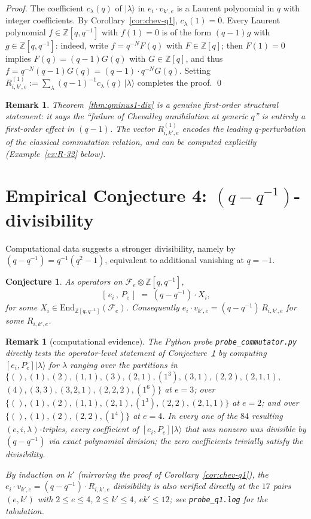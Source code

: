 \documentclass[11pt]{article}
\newtheorem{remark}[theorem]{Remark}
\newtheorem{conjecture}[theorem]{Conjecture}
\theoremstyle{definition}
\newcommand{\Fock}{\mathcal{F}}
\newcommand{\vke}{v_{k',e}}
\begin{document}
\begin{proof}
The coefficient $c_\lambda(q)$ of $|\lambda\rangle$ in $e_i \cdot \vke$ is a
Laurent polynomial in $q$ with integer coefficients. By
Corollary~\ref{cor:chev-q1}, $c_\lambda(1) = 0$. Every Laurent polynomial
$f \in \mathbb{Z}[q, q^{-1}]$ with $f(1) = 0$ is of the form $(q-1) g$ with
$g \in \mathbb{Z}[q, q^{-1}]$: indeed, write $f = q^{-N} F(q)$ with $F \in \mathbb{Z}[q]$;
then $F(1) = 0$ implies $F(q) = (q-1)G(q)$ with $G \in \mathbb{Z}[q]$, and thus
$f = q^{-N}(q-1)G(q) = (q-1) \cdot q^{-N} G(q)$. Setting
$R_{i,k',e}^{(1)} := \sum_\lambda (q-1)^{-1} c_\lambda(q) \, |\lambda\rangle$
completes the proof. \qed
\end{proof}

\begin{remark}
Theorem~\ref{thm:qminus1-div} is a genuine first-order structural statement: it
says the ``failure of Chevalley annihilation at generic $q$'' is entirely a
first-order effect in $(q - 1)$. The vector $R_{i,k',e}^{(1)}$ encodes the
leading $q$-perturbation of the classical commutation relation, and can be
computed explicitly (Example~\ref{ex:R-32} below).
\end{remark}

\section{Empirical Conjecture 4: $(q - q^{-1})$-divisibility}

Computational data suggests a stronger divisibility, namely by
$(q - q^{-1}) = q^{-1}(q^2 - 1)$, equivalent to additional vanishing at $q = -1$.

\begin{conjecture} \label{conj:qminusqinv-div}
As operators on $\Fock_e \otimes \mathbb{Z}[q, q^{-1}]$,
\[
    [\, e_i \,,\, P_e \,] \;=\; (q - q^{-1}) \cdot X_i,
\]
for some $X_i \in \mathrm{End}_{\mathbb{Z}[q, q^{-1}]}(\Fock_e)$. Consequently
$e_i \cdot \vke = (q - q^{-1}) \, R_{i,k',e}$ for some $R_{i,k',e}$.
\end{conjecture}

\begin{remark}[computational evidence]
The Python probe \texttt{probe\_commutator.py} directly tests the operator-level
statement of Conjecture~\ref{conj:qminusqinv-div} by computing
$[e_i, P_e] |\lambda\rangle$ for $\lambda$ ranging over the partitions in
$\{(), (1), (2), (1,1), (3), (2,1), (1^3), (3,1), (2,2), (2,1,1),$
$(4), (3,3), (3,2,1), (2,2,2), (1^6)\}$ at $e=3$; over
$\{(), (1), (2), (1,1), (2,1), (1^3), (2,2), (2,1,1)\}$ at $e=2$; and over
$\{(), (1), (2), (2,2), (1^4)\}$ at $e=4$. In every one of the $84$ resulting
$(e, i, \lambda)$-triples, every coefficient of $[e_i, P_e]|\lambda\rangle$ that
was nonzero was divisible by $(q - q^{-1})$ via exact polynomial division; the
zero coefficients trivially satisfy the divisibility.

By induction on $k'$ (mirroring the proof of Corollary~\ref{cor:chev-q1}), the
$e_i \cdot \vke = (q - q^{-1}) \cdot R_{i,k',e}$ divisibility is also verified
directly at the $17$ pairs $(e, k')$ with $2 \le e \le 4$, $2 \le k' \le 4$,
$ek' \le 12$; see \texttt{probe\_q1.log} for the tabulation.
\end{remark}
\end{document}
